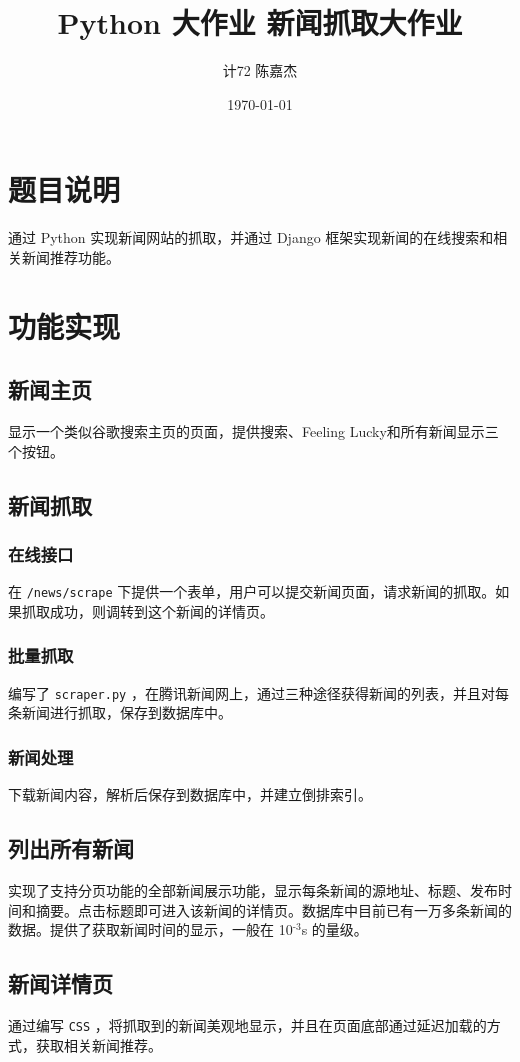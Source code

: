 \documentclass[11pt]{article}
\author{计72 陈嘉杰}
\date{\today}
\title{Python 大作业 新闻抓取大作业}
\begin{document}
\maketitle
\tableofcontents

\section{题目说明}
\label{sec:org458c8a6}
通过 Python 实现新闻网站的抓取，并通过 Django 框架实现新闻的在线搜索和相关新闻推荐功能。

\section{功能实现}
\label{sec:orga192441}
\subsection{新闻主页}
\label{sec:orgcb97a75}
显示一个类似谷歌搜索主页的页面，提供搜索、Feeling Lucky和所有新闻显示三个按钮。
\subsection{新闻抓取}
\label{sec:orga6fcd9c}
\subsubsection{在线接口}
\label{sec:org0b722d0}
在 \texttt{/news/scrape} 下提供一个表单，用户可以提交新闻页面，请求新闻的抓取。如果抓取成功，则调转到这个新闻的详情页。
\subsubsection{批量抓取}
\label{sec:org0573c6a}
编写了 \texttt{scraper.py} ，在腾讯新闻网上，通过三种途径获得新闻的列表，并且对每条新闻进行抓取，保存到数据库中。
\subsubsection{新闻处理}
\label{sec:org366fbcc}
下载新闻内容，解析后保存到数据库中，并建立倒排索引。
\subsection{列出所有新闻}
\label{sec:org1e75b93}
实现了支持分页功能的全部新闻展示功能，显示每条新闻的源地址、标题、发布时间和摘要。点击标题即可进入该新闻的详情页。数据库中目前已有一万多条新闻的数据。提供了获取新闻时间的显示，一般在 10\(^{\text{-3}}\)s 的量级。
\subsection{新闻详情页}
\label{sec:org66791b1}
通过编写 \texttt{CSS} ，将抓取到的新闻美观地显示，并且在页面底部通过延迟加载的方式，获取相关新闻推荐。
\end{document}
